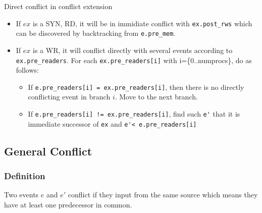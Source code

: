 \documentclass{llncs}
\begin{document}
	\begin{lemma}{Direct conflict in conflict extension}
		\begin{itemize}
			\item
			If $ex$ is a SYN, RD, it will be in immidiate conflict with \verb!ex.post_rws! which can be discovered by backtracking from \verb!e.pre_mem!.
			\item
			If $ex$ is a WR, it will conflict directly with several events according to \verb|ex.pre_readers|. For each \verb|ex.pre_readers[i]| with i=\{0..numprocs\}, do as follows:
			\begin{itemize}
				\item 
					If \verb|e.pre_readers[i] = ex.pre_readers[i]|, then there is no directly conflicting event in branch $i$. Move to the next branch.
				\item
					If \verb|e.pre_readers[i] != ex.pre_readers[i]|, find such \verb|e'| that it is immediate successor of \verb|ex| and \verb|e'< e.pre_readers[i]|
			\end{itemize}
		\end{itemize}
	\end{lemma}
	


\subsection{General Conflict}
\subsubsection{Definition}
Two events $e$ and $e'$ conflict if they input from the same source which means they have at least one predecessor in common.
\end{document}
